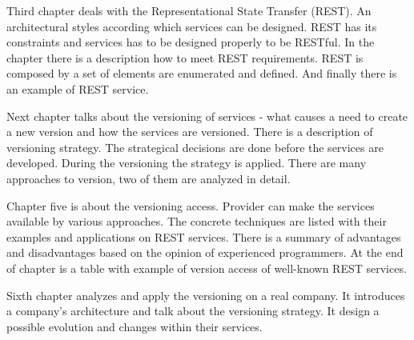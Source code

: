 Third chapter deals with the Representational State Transfer (REST). An architectural styles according which services can be designed. REST has its constraints and services has to be designed properly to be RESTful. In the chapter there is a description how to meet REST requirements. REST is composed by a set of elements are enumerated and defined. And finally there is an example of REST service.

Next chapter talks about the versioning of services - what causes a need to create a new version and how the services are versioned. There is a description of versioning strategy. The strategical decisions are done before the services are developed. During the versioning the strategy is applied. There are many approaches to version, two of them are analyzed in detail.

Chapter five is about the versioning access. Provider can make the services available by various approaches. The concrete techniques are listed with their examples and applications on REST services. There is a summary of advantages and disadvantages based on the opinion of experienced programmers. At the end of chapter is a table with example of version access of well-known REST services.

Sixth chapter analyzes and apply the versioning on a real company. It introduces a company's architecture and talk about the versioning strategy. It design a possible evolution and changes within their services.


